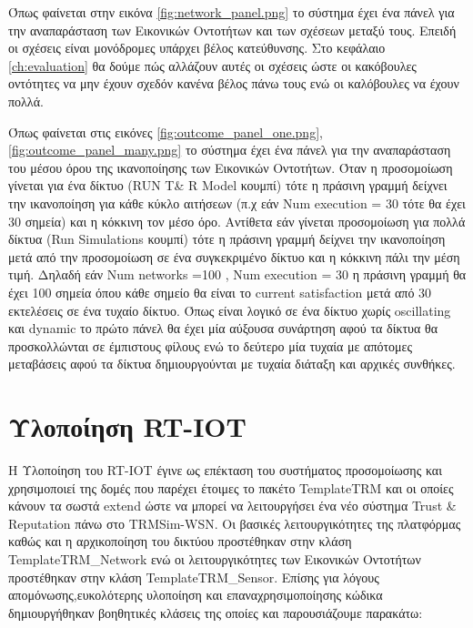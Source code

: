 Όπως φαίνεται στην εικόνα \ref{fig:network_panel.png} το σύστημα έχει ένα πάνελ για την αναπαράσταση των Εικονικών Οντοτήτων και των σχέσεων μεταξύ τους. Επειδή οι σχέσεις είναι μονόδρομες υπάρχει βέλος κατεύθυνσης. Στο κεφάλαιο \ref{ch:evaluation} θα δούμε πώς αλλάζουν αυτές οι σχέσεις ώστε οι κακόβουλες οντότητες να μην έχουν σχεδόν κανένα βέλος πάνω τους ενώ οι καλόβουλες να έχουν πολλά.

\newpage
Όπως φαίνεται στις εικόνες \ref{fig:outcome_panel_one.png}, \ref{fig:outcome_panel_many.png} το σύστημα έχει ένα πάνελ για την αναπαράσταση του μέσου όρου της ικανοποίησης των Εικονικών Οντοτήτων. Όταν η προσομοίωση γίνεται για ένα δίκτυο (RUN T\& R Model κουμπί) τότε η πράσινη γραμμή δείχνει την ικανοποίηση για κάθε κύκλο αιτήσεων (π.χ εάν Num execution = 30 τότε θα έχει 30 σημεία) και η κόκκινη τον μέσο όρο. Αντίθετα εάν γίνεται προσομοίωση για πολλά δίκτυα (Run Simulations κουμπί) τότε η πράσινη γραμμή δείχνει την ικανοποίηση μετά από την προσομοίωση σε ένα συγκεκριμένο δίκτυο και η κόκκινη πάλι την μέση τιμή. Δηλαδή εάν Num networks =100 , Num execution = 30 η πράσινη γραμμή θα έχει 100 σημεία όπου κάθε σημείο θα είναι το current satisfaction μετά από 30 εκτελέσεις σε ένα τυχαίο δίκτυο. Όπως είναι λογικό σε ένα δίκτυο χωρίς oscillating και dynamic το πρώτο πάνελ θα έχει μία αύξουσα συνάρτηση αφού τα δίκτυα θα προσκολλώνται σε έμπιστους φίλους ενώ το δεύτερο μία τυχαία με απότομες μεταβάσεις αφού τα δίκτυα δημιουργούνται με τυχαία διάταξη και αρχικές συνθήκες.



\newpage
\section{Υλοποίηση RT-IOT}

Η Υλοποίηση του RT-IOT έγινε ως επέκταση του συστήματος προσομοίωσης και χρησιμοποιεί της δομές που παρέχει έτοιμες  το πακέτο TemplateTRM 
και οι οποίες κάνουν τα σωστά extend ώστε να μπορεί να λειτουργήσει ένα νέο σύστημα Trust \& Reputation πάνω στο TRMSim-WSN.
 Οι βασικές λειτουργικότητες της πλατφόρμας καθώς και η αρχικοποίηση του δικτύου προστέθηκαν στην κλάση TemplateTRM\_Network 
 ενώ οι λειτουργικότητες των Εικονικών Οντοτήτων προστέθηκαν στην κλάση TemplateTRM\_Sensor. 
 Επίσης για λόγους απομόνωσης,ευκολότερης υλοποίηση και επαναχρησιμοποίησης κώδικα δημιουργήθηκαν βοηθητικές κλάσεις της οποίες και παρουσιάζουμε παρακάτω:


